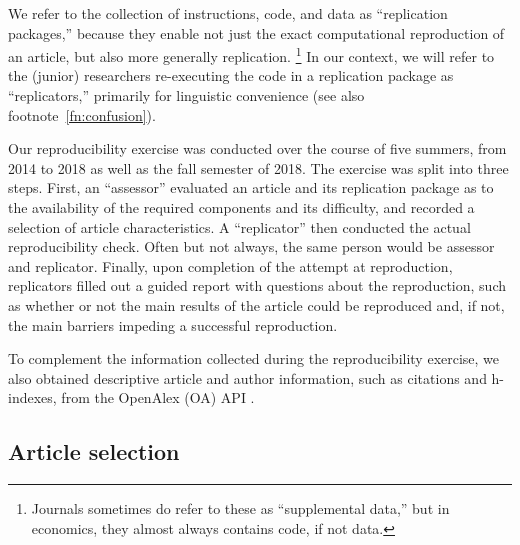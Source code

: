We refer to the collection of instructions, code, and data as ``replication packages,'' because they enable not just the exact computational reproduction of an article, but also more generally replication.%
%
\footnote{Journals sometimes do refer to these as ``supplemental data,'' but in economics, they almost always contains code, if not data.}
%
In our context, we will refer to the (junior) researchers re-executing the code in a replication package as ``replicators,'' primarily for linguistic convenience (see also footnote~\ref{fn:confusion}).

%
%
 
Our reproducibility exercise was conducted over the course of five summers, from 2014 to 2018 as well as the fall semester of 2018. The exercise was split into three steps.  
%
First, an ``assessor'' evaluated an article and its replication package as to the availability of the required components and its difficulty, and recorded a selection of article characteristics. A ``replicator'' then conducted the actual reproducibility check. Often but not always, the same person would be assessor and replicator. Finally, upon completion of the attempt at reproduction, replicators filled out a guided report with questions about the reproduction, such as whether or not the main results of the article could be reproduced and, if not, the main barriers impeding a successful reproduction. 

To complement the information collected during the reproducibility exercise, we also obtained descriptive article and author information, such as citations and h-indexes, from 
the OpenAlex (OA) \ac{API} \parencite{openalex2022,ourresearch2023}.

\subsection{Article selection}

